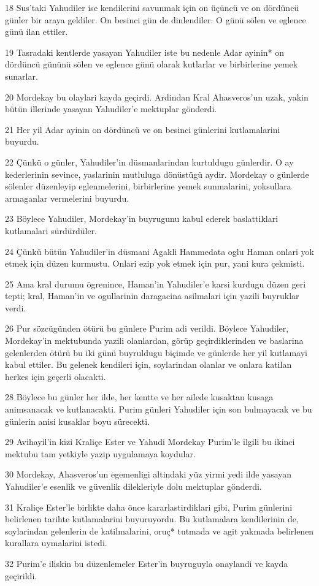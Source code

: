 \par 18 Sus'taki Yahudiler ise kendilerini savunmak için on üçüncü ve on dördüncü günler bir araya geldiler. On besinci gün de dinlendiler. O günü sölen ve eglence günü ilan ettiler.
\par 19 Tasradaki kentlerde yasayan Yahudiler iste bu nedenle Adar ayinin* on dördüncü gününü sölen ve eglence günü olarak kutlarlar ve birbirlerine yemek sunarlar.
\par 20 Mordekay bu olaylari kayda geçirdi. Ardindan Kral Ahasveros'un uzak, yakin bütün illerinde yasayan Yahudiler'e mektuplar gönderdi.
\par 21 Her yil Adar ayinin on dördüncü ve on besinci günlerini kutlamalarini buyurdu.
\par 22 Çünkü o günler, Yahudiler'in düsmanlarindan kurtuldugu günlerdir. O ay kederlerinin sevince, yaslarinin mutluluga dönüstügü aydir. Mordekay o günlerde sölenler düzenleyip eglenmelerini, birbirlerine yemek sunmalarini, yoksullara armaganlar vermelerini buyurdu.
\par 23 Böylece Yahudiler, Mordekay'in buyrugunu kabul ederek baslattiklari kutlamalari sürdürdüler.
\par 24 Çünkü bütün Yahudiler'in düsmani Agakli Hammedata oglu Haman onlari yok etmek için düzen kurmustu. Onlari ezip yok etmek için pur, yani kura çekmisti.
\par 25 Ama kral durumu ögrenince, Haman'in Yahudiler'e karsi kurdugu düzen geri tepti; kral, Haman'in ve ogullarinin daragacina asilmalari için yazili buyruklar verdi.
\par 26 Pur sözcügünden ötürü bu günlere Purim adi verildi. Böylece Yahudiler, Mordekay'in mektubunda yazili olanlardan, görüp geçirdiklerinden ve baslarina gelenlerden ötürü bu iki günü buyruldugu biçimde ve günlerde her yil kutlamayi kabul ettiler. Bu gelenek kendileri için, soylarindan olanlar ve onlara katilan herkes için geçerli olacakti.
\par 28 Böylece bu günler her ilde, her kentte ve her ailede kusaktan kusaga animsanacak ve kutlanacakti. Purim günleri Yahudiler için son bulmayacak ve bu günlerin anisi kusaklar boyu sürecekti.
\par 29 Avihayil'in kizi Kraliçe Ester ve Yahudi Mordekay Purim'le ilgili bu ikinci mektubu tam yetkiyle yazip uygulamaya koydular.
\par 30 Mordekay, Ahasveros'un egemenligi altindaki yüz yirmi yedi ilde yasayan Yahudiler'e esenlik ve güvenlik dilekleriyle dolu mektuplar gönderdi.
\par 31 Kraliçe Ester'le birlikte daha önce kararlastirdiklari gibi, Purim günlerini belirlenen tarihte kutlamalarini buyuruyordu. Bu kutlamalara kendilerinin de, soylarindan gelenlerin de katilmalarini, oruç* tutmada ve agit yakmada belirlenen kurallara uymalarini istedi.
\par 32 Purim'e iliskin bu düzenlemeler Ester'in buyruguyla onaylandi ve kayda geçirildi.

